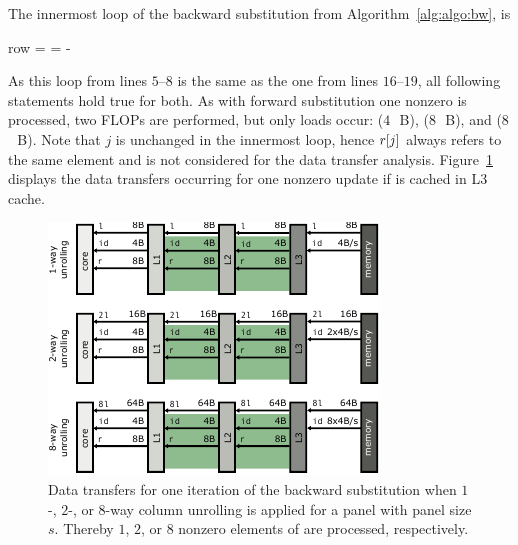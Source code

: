 The innermost loop of the backward substitution from
Algorithm~\ref{alg:algo:bw}, is %
%
\begin{algorithmic}[1]
\setcounter{ALG@line}{4}
    \State row = \nindx[i++]
    \State \nr[j] = \nr[j] - \nr[row] \nlnz[k]
  \EndFor
\end{algorithmic}%
\noindent%
%
As this loop from lines $5$--$8$ is the same as the one from lines $16$--$19$,
all following statements hold true for both. 
%
As with forward substitution one nonzero is processed, two FLOPs are performed,
but only loads occur: \vindx{} ($4$~\,B), \vr{} ($8$~\,B), and \vlnz{} ($8$~\,B).
Note that $j$ is unchanged in the innermost loop, hence $r[j]$ always refers
to the same element and is not considered for the data transfer analysis.
%
Figure~\ref{fig:ecm:data-bw} displays the data transfers occurring for one
nonzero update if \vr{} is cached in L3 cache.

\begin{figure}[t]
  \centering%
  \includegraphics[width=0.75\linewidth,clip=true]{images/ecm-datatransfers-bw}
  \caption{Data transfers for one iteration of the backward
    substitution when $1$-, $2$-, or $8$-way column unrolling is applied
    for a panel with panel size $s$.
    Thereby $1$, $2$, or $8$ nonzero elements of \vlnz{} are processed,
    respectively.
  }
  \label{fig:ecm:data-bw}
\end{figure}

